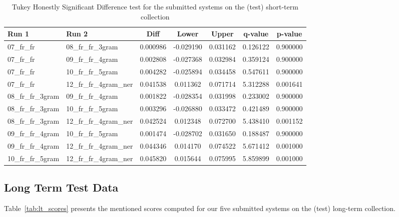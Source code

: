 \begin{table}[h!]
    \centering
    \caption{Tukey Honestly Significant Difference test for the submitted systems on the (test) short-term collection}
    \label{tab:st_comparison}
    \begin{tabular}{|l|l||c|c|c|c|c|}
        \hline
        \textbf{Run 1} & \textbf{Run 2} & \textbf{Diff} & \textbf{Lower} & \textbf{Upper} & \textbf{q-value} & \textbf{p-value} \\ \hline\hline
        07\_fr\_fr & 08\_fr\_fr\_3gram & 0.000986 & -0.029190 & 0.031162 & 0.126122 & 0.900000 \\ \hline
        07\_fr\_fr & 09\_fr\_fr\_4gram & 0.002808 & -0.027368 & 0.032984 & 0.359124 & 0.900000 \\ \hline
        07\_fr\_fr & 10\_fr\_fr\_5gram & 0.004282 & -0.025894 & 0.034458 & 0.547611 & 0.900000 \\ \hline
        07\_fr\_fr & 12\_fr\_fr\_4gram\_ner & 0.041538 & 0.011362 & 0.071714 & 5.312288 & 0.001641 \\ \hline
        08\_fr\_fr\_3gram & 09\_fr\_fr\_4gram & 0.001822 & -0.028354 & 0.031998 & 0.233002 & 0.900000 \\ \hline
        08\_fr\_fr\_3gram & 10\_fr\_fr\_5gram & 0.003296 & -0.026880 & 0.033472 & 0.421489 & 0.900000 \\ \hline
        08\_fr\_fr\_3gram & 12\_fr\_fr\_4gram\_ner & 0.042524 & 0.012348 & 0.072700 & 5.438410 & 0.001152 \\ \hline
        09\_fr\_fr\_4gram & 10\_fr\_fr\_5gram & 0.001474 & -0.028702 & 0.031650 & 0.188487 & 0.900000 \\ \hline
        09\_fr\_fr\_4gram & 12\_fr\_fr\_4gram\_ner & 0.044346 & 0.014170 & 0.074522 & 5.671412 & 0.001000 \\ \hline
        10\_fr\_fr\_5gram & 12\_fr\_fr\_4gram\_ner & 0.045820 & 0.015644 & 0.075995 & 5.859899 & 0.001000 \\ \hline
    \end{tabular}
\end{table}

\subsection{Long Term Test Data}\label{subsec:long_term}

Table~\ref{tab:lt_scores} presents the mentioned scores computed for our five submitted systems on the (test)
long-term collection.\\

